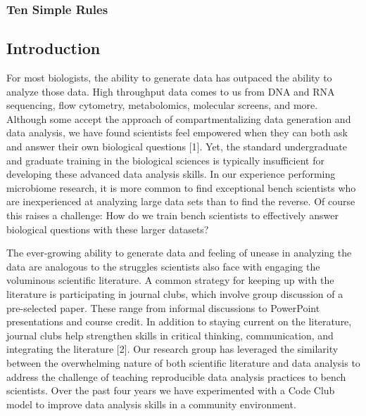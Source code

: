 \documentclass[
  11pt,
]{article}
\begin{document}
\vspace{5mm}

\hypertarget{ten-simple-rules}{%
\subsubsection{Ten Simple Rules}\label{ten-simple-rules}}

\newpage
\linenumbers

\hypertarget{introduction}{%
\subsection{Introduction}\label{introduction}}

For most biologists, the ability to generate data has outpaced the
ability to analyze those data. High throughput data comes to us from DNA
and RNA sequencing, flow cytometry, metabolomics, molecular screens, and
more. Although some accept the approach of compartmentalizing data
generation and data analysis, we have found scientists feel empowered
when they can both ask and answer their own biological questions
{[}1{]}. Yet, the standard undergraduate and graduate training in the
biological sciences is typically insufficient for developing these
advanced data analysis skills. In our experience performing microbiome
research, it is more common to find exceptional bench scientists who are
inexperienced at analyzing large data sets than to find the reverse. Of
course this raises a challenge: How do we train bench scientists to
effectively answer biological questions with these larger datasets?

The ever-growing ability to generate data and feeling of unease in
analyzing the data are analogous to the struggles scientists also face
with engaging the voluminous scientific literature. A common strategy
for keeping up with the literature is participating in journal clubs,
which involve group discussion of a pre-selected paper. These range from
informal discussions to PowerPoint presentations and course credit. In
addition to staying current on the literature, journal clubs help
strengthen skills in critical thinking, communication, and integrating
the literature {[}2{]}. Our research group has leveraged the similarity
between the overwhelming nature of both scientific literature and data
analysis to address the challenge of teaching reproducible data analysis
practices to bench scientists. Over the past four years we have
experimented with a Code Club model to improve data analysis skills in a
community environment.
\end{document}
